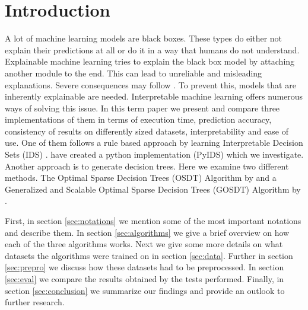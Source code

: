 \documentclass[a4paper,preprint]{sig-alternate-xt}
\begin{document}
\section{Introduction}
\label{sec:into}
A lot of machine learning models are black boxes. These types do either not explain their predictions at all or do it in a way that humans do not understand. Explainable machine learning tries to explain the black box model by attaching another module to the end.
This can lead to unreliable and misleading explanations.
Severe consequences may follow \cite{BBml}.
To prevent this, models that are inherently explainable are needed.
Interpretable machine learning offers numerous ways of solving this issue.
In this term paper we present and compare three implementations of them in terms of execution time, prediction accuracy, consistency of results on differently sized datasets, interpretability and ease of use.
One of them follows a rule based approach by learning Interpretable Decision Sets (IDS) \cite{IDS}.
\citet{pySchwachsinn} have created a python implementation (PyIDS) which we investigate. Another approach is to generate decision trees.
Here we examine two different methods. The Optimal Sparse Decision Trees (OSDT) Algorithm by \citet{OSDT} and a Generalized and Scalable Optimal Sparse Decision Trees (GOSDT) Algorithm by \citet{GOSDT}.

First, in section \ref{sec:notations} we mention some of the most important notations and describe them.
In section \ref{sec:algorithms} we give a brief overview on how each of the three algorithms works.
Next we give some more details on what datasets the algorithms were trained on in section \ref{sec:data}.
Further in section \ref{sec:prepro} we discuss how these datasets had to be preprocessed. In section \ref{sec:eval} we compare the results obtained by the tests performed. Finally, in section \ref{sec:conclusion} we summarize our findings and provide an outlook to further research.

\end{document}

